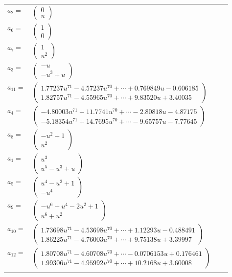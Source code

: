 \documentclass[1p]{elsarticle_modified}
\theoremstyle{definition}
\begin{document}
\begin{tabular}{m{7pt} m{180pt} m{7pt} m{180pt} }
\flushright $a_{2}=$&$\begin{pmatrix}0\\u\end{pmatrix}$ \\
\flushright $a_{6}=$&$\begin{pmatrix}1\\0\end{pmatrix}$ \\
\flushright $a_{7}=$&$\begin{pmatrix}1\\u^2\end{pmatrix}$ \\
\flushright $a_{3}=$&$\begin{pmatrix}- u\\- u^3+u\end{pmatrix}$ \\
\flushright $a_{11}=$&$\begin{pmatrix}1.77237 u^{71}-4.57237 u^{70}+\cdots+0.769849 u-0.606185\\1.82757 u^{71}-4.55965 u^{70}+\cdots+9.83520 u+3.40035\end{pmatrix}$ \\
\flushright $a_{4}=$&$\begin{pmatrix}-4.80003 u^{71}+11.7741 u^{70}+\cdots-2.80818 u-4.87175\\-5.18354 u^{71}+14.7695 u^{70}+\cdots-9.65757 u-7.77645\end{pmatrix}$ \\
\flushright $a_{8}=$&$\begin{pmatrix}- u^2+1\\u^2\end{pmatrix}$ \\
\flushright $a_{1}=$&$\begin{pmatrix}u^3\\u^5- u^3+u\end{pmatrix}$ \\
\flushright $a_{5}=$&$\begin{pmatrix}u^4- u^2+1\\- u^4\end{pmatrix}$ \\
\flushright $a_{9}=$&$\begin{pmatrix}- u^6+u^4-2 u^2+1\\u^6+u^2\end{pmatrix}$ \\
\flushright $a_{10}=$&$\begin{pmatrix}1.73698 u^{71}-4.53698 u^{70}+\cdots+1.12293 u-0.488491\\1.86225 u^{71}-4.76003 u^{70}+\cdots+9.75138 u+3.39997\end{pmatrix}$ \\
\flushright $a_{12}=$&$\begin{pmatrix}1.80708 u^{71}-4.60708 u^{70}+\cdots-0.0706153 u+0.176461\\1.99306 u^{71}-4.95992 u^{70}+\cdots+10.2168 u+3.60008\end{pmatrix}$\\&\end{tabular}
\end{document}
